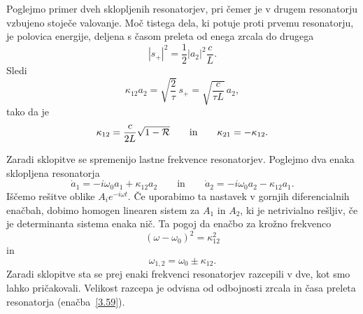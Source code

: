 Poglejmo primer dveh sklopljenih resonatorjev, pri čemer je v drugem resonatorju vzbujeno 
stoječe valovanje. Moč tistega dela, ki potuje proti prvemu resonatorju,
je polovica energije, deljena s časom preleta od enega zrcala do drugega
\begin{equation}
|s_{+}|^{2}=\frac{1}{2}|a_{2}|^{2}\frac{c}{L}.
\label{3.57}
\end{equation}
Sledi
\begin{equation}
\kappa_{12}a_{2}=\sqrt{\frac{2}{\tau}}\, s_{+}=\sqrt{\frac{c}{\tau L}}\, a_{2},
\label{3.58}
\end{equation}
 tako da je 
\begin{equation}
\kappa_{12}=\frac{c}{2L}\sqrt{1-{\cal R}}\qquad \mathrm{in} \qquad \kappa_{21}=-\kappa_{12}.
\label{3.59}
\end{equation}

Zaradi sklopitve se spremenijo lastne frekvence resonatorjev. 
Poglejmo dva enaka sklopljena resonatorja
\begin{equation}
 \dot{a}_{1}  =  -i\omega_{0}a_{1}+\kappa_{12}a_{2} \qquad \mathrm{in} \qquad 
\dot{a}_{2}  =  -i\omega_{0}a_{2}-\kappa_{12}a_{1}.
\end{equation}
Iščemo rešitve oblike $A_{i}e^{-i\omega t}$. Če uporabimo ta nastavek v gornjih
diferencialnih enačbah, dobimo homogen linearen sistem za $A_{1}$ in
$A_{2}$, ki je netrivialno rešljiv, če je determinanta sistema enaka nič.
Ta pogoj da enačbo za krožno frekvenco 
\begin{equation}
(\omega-\omega_{0})^{2}=\kappa_{12}^{2}\label{3.61}
\end{equation}
 in 
\begin{equation}
\omega_{1,2}=\omega_{0}\pm\kappa_{12}.\label{3.62}
\end{equation}
Zaradi sklopitve sta se prej enaki frekvenci resonatorjev razcepili v dve, kot
smo lahko pričakovali. Velikost razcepa je odvisna od odbojnosti zrcala in časa
preleta resonatorja (enačba~\ref{3.59}).
